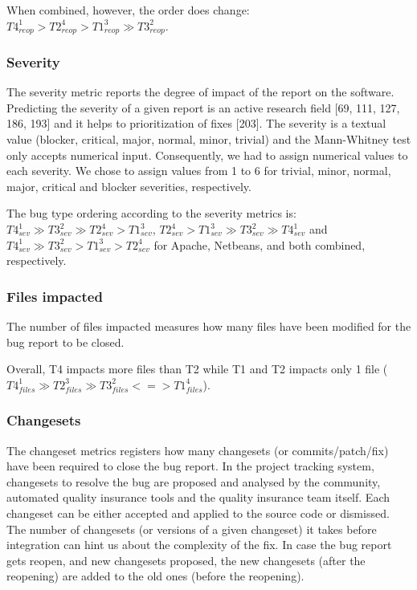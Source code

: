 \documentclass[12pt]{report}
\begin{document}
When combined, however, the order does change:
\(T4_{reop}^1 > T2_{reop}^4 > T1_{reop}^3 \gg T3_{reop}^2\).

\subsubsection{Severity}\label{severity}

The severity metric reports the degree of impact of the report on the
software. Predicting the severity of a given report is an active
research field {[}69, 111, 127, 186, 193{]} and it helps to
prioritization of fixes {[}203{]}. The severity is a textual value
(blocker, critical, major, normal, minor, trivial) and the Mann-Whitney
test only accepts numerical input. Consequently, we had to assign
numerical values to each severity. We chose to assign values from 1 to 6
for trivial, minor, normal, major, critical and blocker severities,
respectively.

The bug type ordering according to the severity metrics is:
\(T4_{sev}^1 \gg T3_{sev}^2 \gg T2_{sev}^4 > T1_{sev}^3\),
\(T2_{sev}^4 > T1_{sev}^3 \gg T3_{sev}^2 \gg T4_{sev}^1\) and
\(T4_{sev}^1 \gg T3_{sev}^2 > T1_{sev}^3 > T2_{sev}^4\) for Apache,
Netbeans, and both combined, respectively.

\subsubsection{Files impacted}\label{files-impacted}

The number of files impacted measures how many files have been modified
for the bug report to be closed.

Overall, T4 impacts more files than T2 while T1 and T2 impacts only 1
file
(\(T4_{files}^1 \gg T2_{files}^3 \gg T3_{files}^2 < = > T1_{files}^4\)).

\subsubsection{Changesets}\label{changesets}

The changeset metrics registers how many changesets (or
commits/patch/fix) have been required to close the bug report. In the
project tracking system, changesets to resolve the bug are proposed and
analysed by the community, automated quality insurance tools and the
quality insurance team itself. Each changeset can be either accepted and
applied to the source code or dismissed. The number of changesets (or
versions of a given changeset) it takes before integration can hint us
about the complexity of the fix. In case the bug report gets reopen, and
new changesets proposed, the new changesets (after the reopening) are
added to the old ones (before the reopening).
\end{document}
